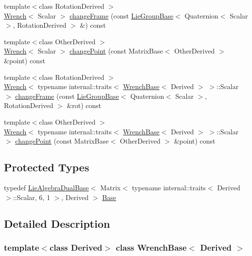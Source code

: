 \begin{DoxyCompactItemize}
\item 
{\footnotesize template$<$class Rotation\+Derived $>$ }\\\hyperlink{class_wrench}{Wrench}$<$ Scalar $>$ \hyperlink{class_wrench_base_a83a6e7bdd6a189a404690657f8ba8b6f}{change\+Frame} (const \hyperlink{class_lie_group_base}{Lie\+Group\+Base}$<$ Quaternion$<$ Scalar $>$, Rotation\+Derived $>$ \&) const
\item 
{\footnotesize template$<$class Other\+Derived $>$ }\\\hyperlink{class_wrench}{Wrench}$<$ Scalar $>$ \hyperlink{class_wrench_base_a485dd3f045ae5e8f6709efb4c9e9dd2c}{change\+Point} (const Matrix\+Base$<$ Other\+Derived $>$ \&point) const
\item 
{\footnotesize template$<$class Rotation\+Derived $>$ }\\\hyperlink{class_wrench}{Wrench}$<$ typename internal\+::traits$<$ \hyperlink{class_wrench_base}{Wrench\+Base}$<$ Derived $>$ $>$\+::Scalar $>$ \hyperlink{class_wrench_base_a93689833f79db91100981b4a12a70f3b}{change\+Frame} (const \hyperlink{class_lie_group_base}{Lie\+Group\+Base}$<$ Quaternion$<$ Scalar $>$, Rotation\+Derived $>$ \&rot) const
\item 
{\footnotesize template$<$class Other\+Derived $>$ }\\\hyperlink{class_wrench}{Wrench}$<$ typename internal\+::traits$<$ \hyperlink{class_wrench_base}{Wrench\+Base}$<$ Derived $>$ $>$\+::Scalar $>$ \hyperlink{class_wrench_base_ae0f1aceb90c2cd1e09d83e24462b6ce7}{change\+Point} (const Matrix\+Base$<$ Other\+Derived $>$ \&point) const
\end{DoxyCompactItemize}
\subsection*{Protected Types}
\begin{DoxyCompactItemize}
\item 
typedef \hyperlink{class_lie_algebra_dual_base}{Lie\+Algebra\+Dual\+Base}$<$ Matrix$<$ typename internal\+::traits$<$ Derived $>$\+::Scalar, 6, 1 $>$, Derived $>$ \hyperlink{class_wrench_base_a961baad29dfcc45c7c2b847fa8c5c43d}{Base}
\end{DoxyCompactItemize}


\subsection{Detailed Description}
\subsubsection*{template$<$class Derived$>$\newline
class Wrench\+Base$<$ Derived $>$}

